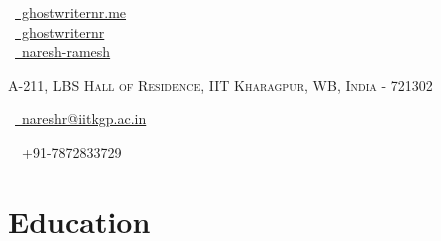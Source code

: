 \documentclass[a4paper,10pt]{extarticle} %
\begin{document}
\pagestyle{empty} %


\begin{multicols}{3}
\normalsize  \faGlobe\ {\href{http://ghostwriternr.me/}{\  ghostwriternr.me}}\\
\normalsize \faGithub\ {\href{https://github.com/ghostwriternr}{\  ghostwriternr}}\\
\normalsize  \faLinkedinSquare\ {\href{https://www.linkedin.com/in/naresh-ramesh}{\  naresh-ramesh}}\\
\columnbreak
\normalsize\par{\par} %
\par{\centering\normalsize {\textsc{A-211, LBS Hall of Residence, IIT Kharagpur, WB, India - 721302}}\hfill\par}
\columnbreak
\raggedright\hfill\normalsize \faEnvelope\ {\href{mailto:nareshr@iitkgp.ac.in}{\  nareshr@iitkgp.ac.in}}\\
\raggedright\hfill{\faPhone\ \  +91-7872833729}
\end{multicols}


\vspace{-0.6cm}
\section{\textcolor{primary}{Education}}
\end{document}
